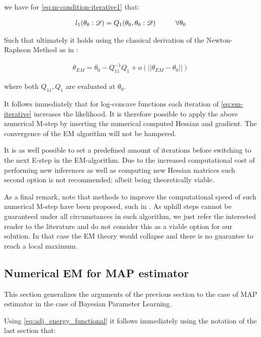 \documentclass[11pt]{article}
\begin{document}
\begin{article}
we have for \ref{eq:m-condition-iterative1} that:

\begin{align} 
 l_1(\theta_0: \mathscr{D})  = Q_1(\theta_0, \theta_0: \mathscr{D}) \hspace*{1cm} \forall \theta_0 \label{eq:m-condition-entropy-iterative2} 
\end{align}

Such that ultimately it holds using the classical derivation of the
Newton-Raphson Method as in \cite{storvik2007numerical}:


\begin{align} 
 \theta_{EM}  = \theta_{0} - Q_{11}^{-1} Q_1 + o(||\theta_{EM} - \theta_{0}||) \label{eq:em-iterative}
\end{align}

where both \(Q_{11}, Q_{1}\) are evaluated at \(\theta_0\).

It follows immediately that for log-concave functions each
iteration of \ref{eq:em-iterative} increases the likelihood. It is
therefore possible to apply the above numerical M-step by inserting
the numerical computed Hessian and gradient. The convergence of the
EM algorithm will not be hampered.

It is as well possible to set a predefined amount of iterations
before switching to the next E-step in the EM-algorithm. Due to the
increased computational cost of performing new inferences as well
as computing new Hessian matrices such second option is not
recommended; albeit being theoretically viable.

As a final remark, note that methods to improve the computational
speed of such numerical M-step have been proposed, such in
\cite{Louis_1982}. As uphill steps cannot be guaranteed under all
circumstances in such algorithm, we just refer the interested
reader to the literature and do not consider this as a viable
option for our solution. In that case the EM theory would collapse
and there is no guarantee to reach a local maximum.

\subsection{Numerical EM for MAP estimator}
\label{sec:org7099be0}

This section generalizes the arguments of the previous section to
the case of MAP estimator in the case of Bayesian Parameter
Learning.

Using \ref{eq:adj_energy_functional} it follows immediately using the
notation of the last section that:


\end{article}
\end{document}
